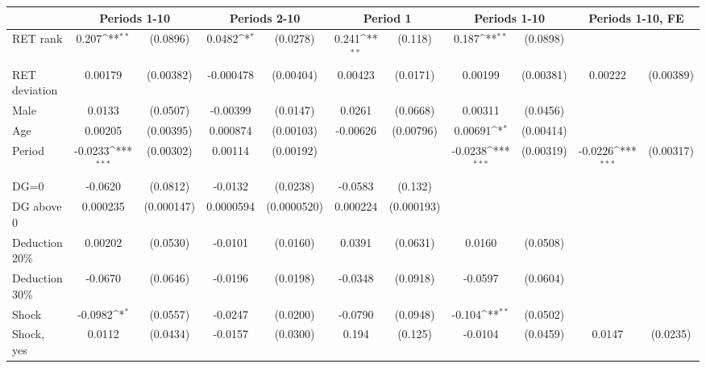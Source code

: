 {
\def\sym#1{\ifmmode^{#1}\else\(^{#1}\)\fi}
\begin{tabular}{l*{5}{cc}}
\hline\hline
                &\multicolumn{2}{c}{Periods 1-10}&\multicolumn{2}{c}{Periods 2-10}&\multicolumn{2}{c}{Period 1}&\multicolumn{2}{c}{Periods 1-10}&\multicolumn{2}{c}{Periods 1-10, FE}\\
\hline
RET rank        &    0.207\sym{**} & (0.0896)&   0.0482\sym{*}  & (0.0278)&    0.241\sym{**} &  (0.118)&    0.187\sym{**} & (0.0898)&                  &         \\
RET deviation   &  0.00179         &(0.00382)&-0.000478         &(0.00404)&  0.00423         & (0.0171)&  0.00199         &(0.00381)&  0.00222         &(0.00389)\\
Male            &   0.0133         & (0.0507)& -0.00399         & (0.0147)&   0.0261         & (0.0668)&  0.00311         & (0.0456)&                  &         \\
Age             &  0.00205         &(0.00395)& 0.000874         &(0.00103)& -0.00626         &(0.00796)&  0.00691\sym{*}  &(0.00414)&                  &         \\
Period          &  -0.0233\sym{***}&(0.00302)&  0.00114         &(0.00192)&                  &         &  -0.0238\sym{***}&(0.00319)&  -0.0226\sym{***}&(0.00317)\\
DG=0            &  -0.0620         & (0.0812)&  -0.0132         & (0.0238)&  -0.0583         &  (0.132)&                  &         &                  &         \\
DG above 0      & 0.000235         &(0.000147)&0.0000594         &(0.0000520)& 0.000224         &(0.000193)&                  &         &                  &         \\
Deduction 20\%  &  0.00202         & (0.0530)&  -0.0101         & (0.0160)&   0.0391         & (0.0631)&   0.0160         & (0.0508)&                  &         \\
Deduction 30\%  &  -0.0670         & (0.0646)&  -0.0196         & (0.0198)&  -0.0348         & (0.0918)&  -0.0597         & (0.0604)&                  &         \\
Shock           &  -0.0982\sym{*}  & (0.0557)&  -0.0247         & (0.0200)&  -0.0790         & (0.0948)&   -0.104\sym{**} & (0.0502)&                  &         \\
Shock, yes      &   0.0112         & (0.0434)&  -0.0157         & (0.0300)&    0.194         &  (0.125)&  -0.0104         & (0.0459)&   0.0147         & (0.0235)\\

\end{tabular}}
